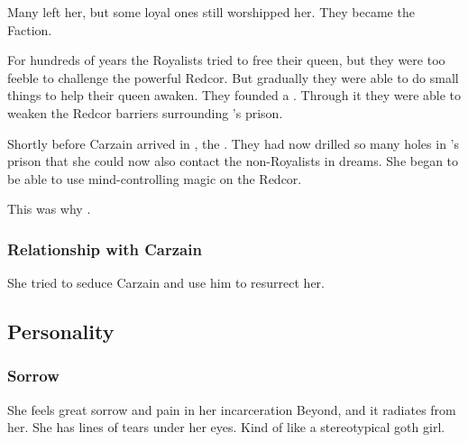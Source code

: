 Many left her, but some loyal ones still worshipped her. 
They became the  Faction. 

For hundreds of years the Royalists tried to free their queen, but they were too feeble to challenge the powerful Redcor. 
But gradually they were able to do small things to help their queen awaken. 
They founded a . 
Through it they were able to weaken the Redcor barriers surrounding \Belzir's prison.

Shortly before Carzain \Shachar arrived in \Redce, the . 
They had now drilled so many holes in \Belzir's prison that she could now also contact the non-Royalists in dreams.
She began to be able to use mind-controlling magic on the Redcor. 

This was why . 





\subsubsection{Relationship with Carzain}
She tried to seduce Carzain and use him to resurrect her. 










\subsection{Personality}





\subsubsection{Sorrow}
She feels great sorrow and pain in her incarceration Beyond, and it radiates from her. 
She has lines of tears under her eyes. 
Kind of like a stereotypical goth girl.

